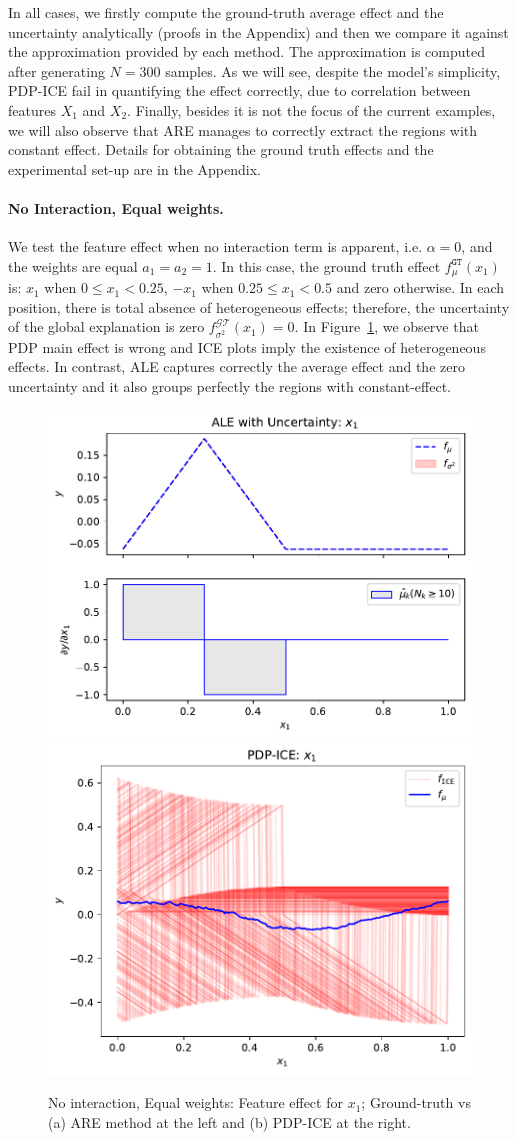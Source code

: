 \documentclass[twoside]{article}
\begin{document}
In all cases, we firstly compute the ground-truth average effect and
the uncertainty analytically (proofs in the Appendix) and then we
compare it against the approximation provided by each method. The
approximation is computed after generating \(N=300\) samples. As we
will see, despite the model's simplicity, PDP-ICE fail in quantifying
the effect correctly, due to correlation between features \(X_1\) and
\(X_2\). Finally, besides it is not the focus of the current examples,
we will also observe that ARE manages to correctly extract the
regions with constant effect. Details for obtaining the ground truth
effects and the experimental set-up are in the Appendix.

\paragraph{No Interaction, Equal weights.}

We test the feature effect when no interaction term is apparent,
i.e. \(\alpha=0\), and the weights are equal \(a_1=a_2=1\).  In this
case, the ground truth effect \(f_\mu^{\mathtt{GT}}(x_1)\) is: \(x_1\)
when \(0 \leq x_1 < 0.25\), \(-x_1\) when \(0.25 \leq x_1 < 0.5\) and
zero otherwise. In each position, there is total absence of
heterogeneous effects; therefore, the uncertainty of the global
explanation is zero \(f^{\mathcal{GT}}_{\sigma^2}(x_1) = 0\). In
Figure~\ref{fig:synth-ex-1-case-1}, we observe that PDP main effect is
wrong and ICE plots imply the existence of heterogeneous effects. In
contrast, ALE captures correctly the average effect and the zero
uncertainty and it also groups perfectly the regions with
constant-effect.

\begin{figure}[h]
  \centering
  \includegraphics[width=.23\textwidth]{example_1/dale_feat_0.pdf}
  \includegraphics[width=.23\textwidth]{example_1/pdp_ice_feat_0.pdf}
  \caption{No interaction, Equal weights: Feature effect for \(x_1\);
    Ground-truth vs (a) ARE method at the left and (b) PDP-ICE at the
    right.}
  \label{fig:synth-ex-1-case-1}
\end{figure}
\end{document}
